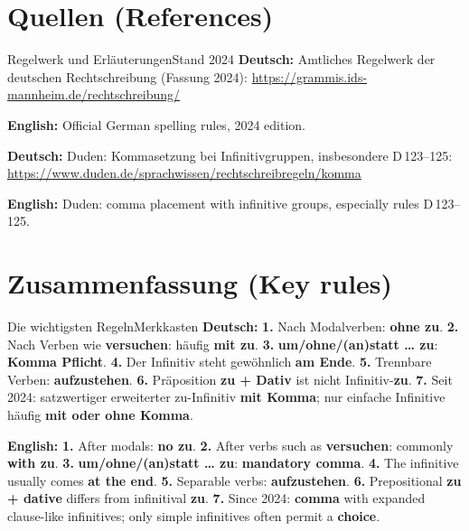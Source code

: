 \documentclass[a4paper,11pt]{article}
\newcommand{\GermanText}[1]{\textbf{Deutsch: }#1\par}
\newcommand{\EnglishText}[1]{{\small\color{SoftGray}\textbf{English: }#1\par}}
\begin{document}
\section{Quellen \textnormal{(References)}}
\begin{grammarentry}{Regelwerk und Erläuterungen}{Stand 2024}
\GermanText{Amtliches Regelwerk der deutschen Rechtschreibung (Fassung 2024): \url{https://grammis.ids-mannheim.de/rechtschreibung/}}
\EnglishText{Official German spelling rules, 2024 edition.}
\GermanText{Duden: Kommasetzung bei Infinitivgruppen, insbesondere D\,123--125: \url{https://www.duden.de/sprachwissen/rechtschreibregeln/komma}}
\EnglishText{Duden: comma placement with infinitive groups, especially rules D\,123--125.}
\end{grammarentry}

\section{Zusammenfassung \textnormal{(Key rules)}}
\begin{grammarentry}{Die wichtigsten Regeln}{Merkkasten}
\GermanText{\textbf{1.} Nach Modalverben: \textbf{ohne zu}. \textbf{2.} Nach Verben wie \textbf{versuchen}: häufig \textbf{mit zu}. \textbf{3.} \textbf{um/ohne/(an)statt \ldots{} zu}: \textbf{Komma Pflicht}. \textbf{4.} Der Infinitiv steht gewöhnlich \textbf{am Ende}. \textbf{5.} Trennbare Verben: \textbf{aufzustehen}. \textbf{6.} Präposition \textbf{zu + Dativ} ist nicht Infinitiv-\textbf{zu}. \textbf{7.} Seit 2024: satzwertiger erweiterter zu-Infinitiv \textbf{mit Komma}; nur einfache Infinitive häufig \textbf{mit oder ohne Komma}.}
\EnglishText{\textbf{1.} After modals: \textbf{no zu}. \textbf{2.} After verbs such as \textbf{versuchen}: commonly \textbf{with zu}. \textbf{3.} \textbf{um/ohne/(an)statt \ldots{} zu}: \textbf{mandatory comma}. \textbf{4.} The infinitive usually comes \textbf{at the end}. \textbf{5.} Separable verbs: \textbf{aufzustehen}. \textbf{6.} Prepositional \textbf{zu + dative} differs from infinitival \textbf{zu}. \textbf{7.} Since 2024: \textbf{comma} with expanded clause-like infinitives; only simple infinitives often permit a \textbf{choice}.}
\end{grammarentry}
\end{document}
